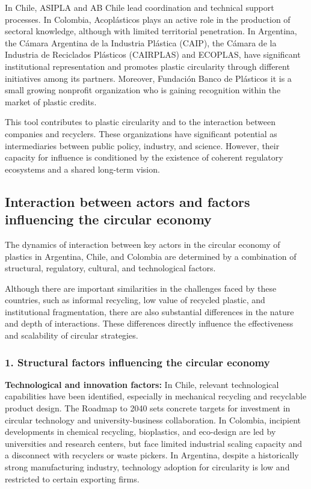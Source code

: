 \documentclass[
  12pt,
  oneside]{book}
\begin{document}
In Chile, ASIPLA and AB Chile lead coordination and technical support
processes. In Colombia, Acoplásticos plays an active role in the
production of sectoral knowledge, although with limited territorial
penetration. In Argentina, the Cámara Argentina de la Industria Plástica
(CAIP), the Cámara de la Industria de Reciclados Plásticos (CAIRPLAS)
and ECOPLAS, have significant institutional representation and promotes
plastic circularity through different initiatives among its partners.
Moreover, Fundación Banco de Plásticos it is a small growing nonprofit
organization who is gaining recognition within the market of plastic
credits.

This tool contributes to plastic circularity and to the interaction
between companies and recyclers. These organizations have significant
potential as intermediaries between public policy, industry, and
science. However, their capacity for influence is conditioned by the
existence of coherent regulatory ecosystems and a shared long-term
vision.

\subsection{Interaction between actors and factors influencing the
circular
economy}\label{interaction-between-actors-and-factors-influencing-the-circular-economy}

The dynamics of interaction between key actors in the circular economy
of plastics in Argentina, Chile, and Colombia are determined by a
combination of structural, regulatory, cultural, and technological
factors.

Although there are important similarities in the challenges faced by
these countries, such as informal recycling, low value of recycled
plastic, and institutional fragmentation, there are also substantial
differences in the nature and depth of interactions. These differences
directly influence the effectiveness and scalability of circular
strategies.

\subsubsection{1. Structural factors influencing the circular
economy}\label{structural-factors-influencing-the-circular-economy}

\textbf{Technological and innovation factors:} In Chile, relevant
technological capabilities have been identified, especially in
mechanical recycling and recyclable product design. The Roadmap to 2040
sets concrete targets for investment in circular technology and
university-business collaboration. In Colombia, incipient developments
in chemical recycling, bioplastics, and eco-design are led by
universities and research centers, but face limited industrial scaling
capacity and a disconnect with recyclers or waste pickers. In Argentina,
despite a historically strong manufacturing industry, technology
adoption for circularity is low and restricted to certain exporting
firms.
\end{document}
